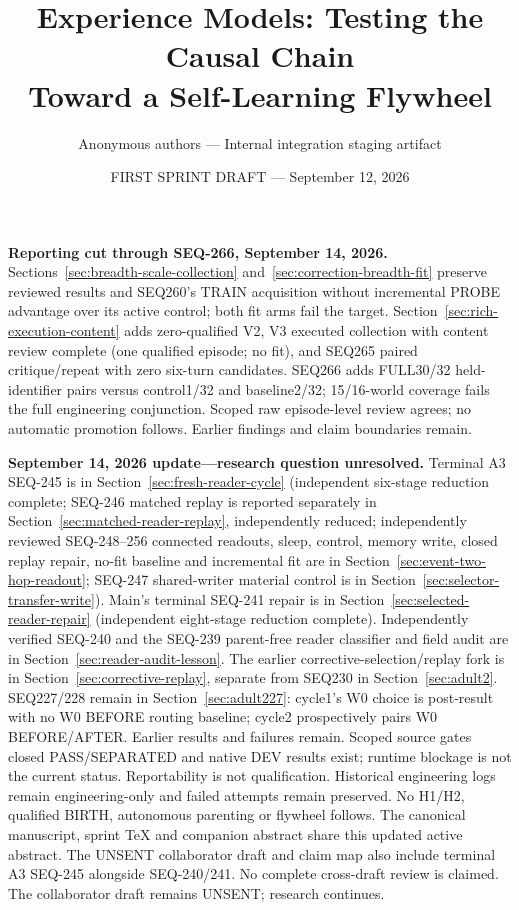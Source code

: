 \documentclass[11pt]{article}
\title{Experience Models: Testing the Causal Chain\texorpdfstring{\\}{ }Toward a Self-Learning Flywheel}
\author{Anonymous authors --- Internal integration staging artifact}
\date{FIRST SPRINT DRAFT --- September 12, 2026}
\begin{document}
\maketitle

\noindent\textbf{Reporting cut through SEQ-266, September 14, 2026.}
Sections~\ref{sec:breadth-scale-collection} and~\ref{sec:correction-breadth-fit}
preserve reviewed results and SEQ260's TRAIN acquisition without incremental
PROBE advantage over its active control; both fit arms fail the target.
Section~\ref{sec:rich-execution-content} adds zero-qualified V2, V3 executed
collection with content review complete (one qualified episode; no fit),
and SEQ265 paired critique/repeat with zero
six-turn candidates. SEQ266 adds FULL30/32 held-identifier pairs versus control1/32 and baseline2/32;
15/16-world coverage fails the full engineering conjunction. Scoped raw episode-level review
agrees; no automatic promotion follows.
Earlier findings and claim boundaries remain.

\noindent\textbf{September 14, 2026 update---research question unresolved.}
Terminal A3 SEQ-245 is in Section~\ref{sec:fresh-reader-cycle}
(independent six-stage reduction complete; SEQ-246 matched replay is
reported separately in Section~\ref{sec:matched-reader-replay}, independently reduced;
independently reviewed SEQ-248--256 connected readouts, sleep, control, memory write, closed replay repair, no-fit baseline and incremental fit are in
Section~\ref{sec:event-two-hop-readout}; SEQ-247 shared-writer material control
is in Section~\ref{sec:selector-transfer-write}).
Main's terminal SEQ-241 repair is in Section~\ref{sec:selected-reader-repair}
(independent eight-stage reduction complete). Independently verified SEQ-240 and the
SEQ-239 parent-free reader classifier and field audit are in
Section~\ref{sec:reader-audit-lesson}. The earlier corrective-selection/replay fork is in
Section~\ref{sec:corrective-replay}, separate from SEQ230 in
Section~\ref{sec:adult2}. SEQ227/228 remain in Section~\ref{sec:adult227}:
cycle1's W0 choice is post-result with no W0 BEFORE routing baseline;
cycle2 prospectively pairs W0 BEFORE/AFTER. Earlier results and failures remain.
Scoped source gates closed PASS/SEPARATED and native DEV results exist;
runtime blockage is not the current status. Reportability is not qualification.
Historical engineering logs remain engineering-only and failed attempts remain
preserved. No H1/H2, qualified BIRTH, autonomous parenting or flywheel follows.
The canonical manuscript, sprint TeX and companion abstract share this updated
active abstract. The UNSENT collaborator draft and claim map also include terminal A3 SEQ-245 alongside SEQ-240/241.
No complete cross-draft review is claimed. The collaborator draft remains
UNSENT; research continues.
\end{document}
